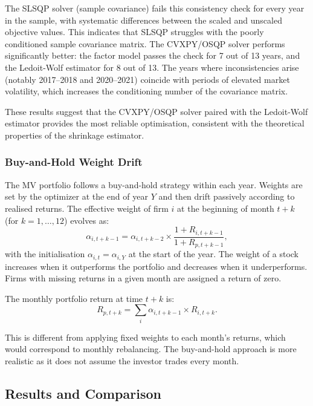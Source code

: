 \documentclass[11pt,a4paper]{article}
\begin{document}
The SLSQP solver (sample covariance) fails this consistency check for every year in the sample, with systematic differences between the scaled and unscaled objective values. This indicates that SLSQP struggles with the poorly conditioned sample covariance matrix. The CVXPY/OSQP solver performs significantly better: the factor model passes the check for 7 out of 13 years, and the Ledoit-Wolf estimator for 8 out of 13. The years where inconsistencies arise (notably 2017--2018 and 2020--2021) coincide with periods of elevated market volatility, which increases the conditioning number of the covariance matrix.

These results suggest that the CVXPY/OSQP solver paired with the Ledoit-Wolf estimator provides the most reliable optimisation, consistent with the theoretical properties of the shrinkage estimator.

\subsubsection{Buy-and-Hold Weight Drift}

The MV portfolio follows a buy-and-hold strategy within each year. Weights are set by the optimizer at the end of year \(Y\) and then drift passively according to realised returns. The effective weight of firm \(i\) at the beginning of month \(t+k\) (for \(k = 1, \dots, 12\)) evolves as:
\begin{equation}
\alpha_{i,t+k-1} = \alpha_{i,t+k-2} \times \frac{1 + R_{i,t+k-1}}{1 + R_{p,t+k-1}},
\end{equation}
with the initialisation \(\alpha_{i,t} = \alpha_{i,Y}\) at the start of the year. The weight of a stock increases when it outperforms the portfolio and decreases when it underperforms. Firms with missing returns in a given month are assigned a return of zero.

The monthly portfolio return at time \(t+k\) is:
\begin{equation}
R_{p,t+k} = \sum_i \alpha_{i,t+k-1} \times R_{i,t+k}.
\end{equation}

This is different from applying fixed weights to each month's returns, which would correspond to monthly rebalancing. The buy-and-hold approach is more realistic as it does not assume the investor trades every month.

\subsection{Results and Comparison}
\end{document}
